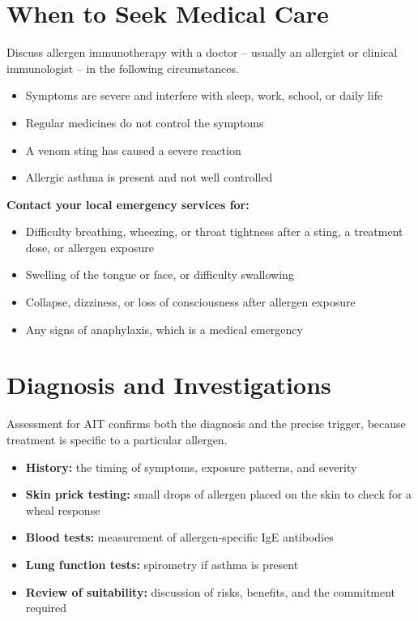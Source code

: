 \section*{When to Seek Medical Care}
Discuss allergen immunotherapy with a doctor -- usually an allergist or clinical immunologist -- in the following circumstances.

\begin{itemize}
    \item Symptoms are severe and interfere with sleep, work, school, or daily life
    \item Regular medicines do not control the symptoms
    \item A venom sting has caused a severe reaction
    \item Allergic asthma is present and not well controlled
\end{itemize}

\textbf{Contact your local emergency services for:}
\begin{itemize}
    \item Difficulty breathing, wheezing, or throat tightness after a sting, a treatment dose, or allergen exposure
    \item Swelling of the tongue or face, or difficulty swallowing
    \item Collapse, dizziness, or loss of consciousness after allergen exposure
    \item Any signs of anaphylaxis, which is a medical emergency
\end{itemize}

\section*{Diagnosis and Investigations}
Assessment for AIT confirms both the diagnosis and the precise trigger, because treatment is specific to a particular allergen.

\begin{itemize}
    \item \textbf{History:} the timing of symptoms, exposure patterns, and severity
    \item \textbf{Skin prick testing:} small drops of allergen placed on the skin to check for a wheal response
    \item \textbf{Blood tests:} measurement of allergen-specific IgE antibodies
    \item \textbf{Lung function tests:} spirometry if asthma is present
    \item \textbf{Review of suitability:} discussion of risks, benefits, and the commitment required
\end{itemize}

